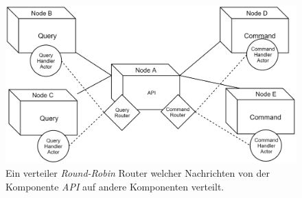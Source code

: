 \begin{figure}
    \centering
    \includegraphics[width=\linewidth]{gfx/implementation/ClusterRouter}
    \caption{Ein verteiler \textit{Round-Robin} Router welcher Nachrichten von der Komponente \textit{API} auf andere Komponenten verteilt.}
    \label{fig:implementation:routing}
\end{figure} 

